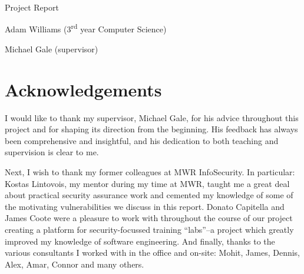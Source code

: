 \documentclass[a4paper,openany,12pt]{book}
\begin{document}
\begin{titlepage}
{}
    
    {\par}
    \vspace{1.25cm}
    \vspace{3.5cm}
    {\hspace{1.60cm}\Huge \warwickfont Project Report}
    \vspace{0.16cm}
    {\par}
    {\hspace{1.60cm}\large \warwickfont Adam Williams (3\textsuperscript{rd} year Computer Science)}


    {\hspace{1.60cm}\large \warwickfont Michael Gale (supervisor)}
    \vfill
\end{titlepage}
\restoregeometry
\restorepagecolor

\tableofcontents
\pagebreak[5]
\vspace{2em}
\section*{Acknowledgements}

I would like to thank my supervisor, Michael Gale, for his advice throughout this project and for shaping its
direction from the beginning. His feedback has always been comprehensive and insightful, and his dedication to
both teaching and supervision is clear to me.

Next, I wish to thank my former colleagues at MWR InfoSecurity. In particular: Kostas Lintovois, my mentor during
my time at MWR, taught me a great deal about practical security assurance work and cemented my knowledge of some of the
motivating vulnerabilities we discuss in this report. Donato Capitella and James Coote were a pleasure to work with
throughout the course of our project creating a platform for security-focussed training ``labs''--a project which
greatly improved my knowledge of software engineering.
And finally, thanks to the various consultants I worked with in the office and on-site: Mohit, James, Dennis, Alex, Amar,
Connor and many others.
\end{document}
